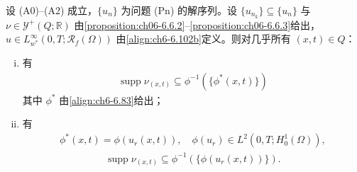 \documentclass[../../main.tex]{subfiles}%
\begin{document}
\begin{proposition}\label{proposition:ch06-6.6.6}
设 (A0)--(A2) 成立，$\{u_n\}$ 为问题 (Pn) 的解序列。设 $\{u_{n_k}\}\subseteq\{u_n\}$ 与 $\nu\in\mathcal{Y}^+(Q;\mathbb{R})$ 由\cref{proposition:ch06-6.6.2}--\cref{proposition:ch06-6.6.3}给出，$u\in L^\infty_{w^*}(0,T;\mathscr{R}_f(\Omega))$ 由\eqref{align:ch6-6.102b}定义。则对几乎所有 $(x,t)\in Q$：
\begin{enumerate}[(i)]
\item 有
\begin{align}
\operatorname{supp}\nu_{(x,t)}\subseteq\phi^{-1}(\{\phi^*(x,t)\}) \label{align:ch6-6.112}
\end{align}
其中 $\phi^*$ 由\eqref{align:ch6-6.83}给出；
\item 有
\begin{align}
\phi^*(x,t)=\phi(u_r(x,t)),\quad
\phi(u_r)\in L^2(0,T;H^1_0(\Omega)), \label{align:ch6-6.113}
\end{align}
\begin{align}
\operatorname{supp}\nu_{(x,t)}\subseteq\phi^{-1}(\{\phi(u_r(x,t))\}). \label{align:ch6-6.114}
\end{align}
\end{enumerate}
\end{proposition}
\end{document}
